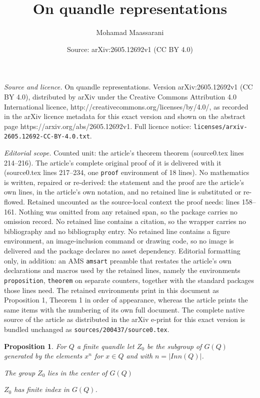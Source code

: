 \documentclass[10pt,a4paper]{amsart}
\title{On quandle representations}
\author{Mohamad Maassarani}
\date{Source: arXiv:2605.12692v1 (CC BY 4.0)}
\newtheorem{proposition}{Proposition}
\begin{document}
\maketitle

\noindent\emph{Source and licence.} On quandle representations. Version arXiv:2605.12692v1 (CC BY 4.0), distributed by arXiv under the Creative Commons Attribution 4.0 International licence, http://creativecommons.org/licenses/by/4.0/, as recorded in the arXiv licence metadata for this exact version and shown on the abstract page https://arxiv.org/abs/2605.12692v1. Full licence notice: \texttt{licenses/arxiv-2605.12692-CC-BY-4.0.txt}.\par\smallskip

\noindent\textit{Editorial scope.} Counted unit: the article's theorem theorem (source0.tex lines 214--216). The article's complete original proof of it is delivered with it (source0.tex lines 217--234, one \texttt{proof} environment of 18 lines). No mathematics is written, repaired or re-derived: the statement and the proof are the article's own lines, in the article's own notation, and no retained line is substituted or re-flowed.  Retained uncounted as the source-local context the proof needs: lines 158--161.  Nothing was omitted from any retained span, so the package carries no omission record.  No retained line contains a citation, so the wrapper carries no bibliography and no bibliography entry.  No retained line contains a figure environment, an image-inclusion command or drawing code, so no image is delivered and the package declares no asset dependency.  Editorial formatting only, in addition: an AMS \texttt{amsart} preamble that restates the article's own declarations and macros used by the retained lines, namely the environments \texttt{proposition}, \texttt{theorem} on separate counters, together with the standard packages those lines need.  The retained environments print in this document as Proposition 1, Theorem 1 in order of appearance, whereas the article prints the same items with the numbering of its own full document.  The complete native source of the article as distributed in the arXiv e-print for this exact version is bundled unchanged as \texttt{sources/200437/source0.tex}.
\begin{proposition}\label{Z0} For $Q$ a finite quandle let $Z_0$ be the subgroup of $G(Q)$ generated by the elements $x^n$ for $x\in Q$ and with $n=\vert Inn(Q) \vert $.
\item[1)] The group $Z_0$ lies in the center of $G(Q)$
\item[2)] $Z_0$ has finite index in $G(Q)$.
\end{proposition}
\end{document}
